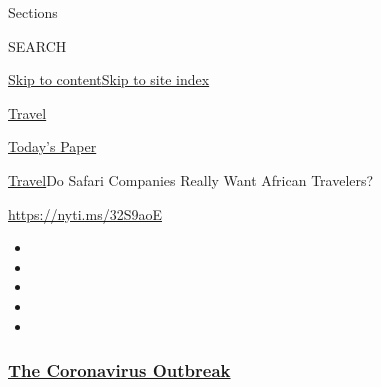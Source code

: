 Sections

SEARCH

\protect\hyperlink{site-content}{Skip to
content}\protect\hyperlink{site-index}{Skip to site index}

\href{https://www.nytimes3xbfgragh.onion/section/travel}{Travel}

\href{https://myaccount.nytimes3xbfgragh.onion/auth/login?response_type=cookie\&client_id=vi}{}

\href{https://www.nytimes3xbfgragh.onion/section/todayspaper}{Today's
Paper}

\href{/section/travel}{Travel}\textbar{}Do Safari Companies Really Want
African Travelers?

\url{https://nyti.ms/32S9aoE}

\begin{itemize}
\item
\item
\item
\item
\item
\end{itemize}

\hypertarget{the-coronavirus-outbreak}{%
\subsubsection{\texorpdfstring{\href{https://www.nytimes3xbfgragh.onion/news-event/coronavirus?name=styln-coronavirus-national\&region=TOP_BANNER\&block=storyline_menu_recirc\&action=click\&pgtype=Article\&impression_id=805bfd90-f1ad-11ea-b69e-dd4be0f736de\&variant=undefined}{The
Coronavirus
Outbreak}}{The Coronavirus Outbreak}}\label{the-coronavirus-outbreak}}

